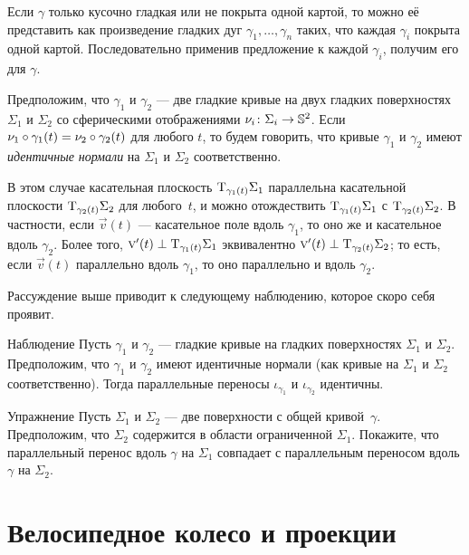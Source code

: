 Если $\gamma$ только кусочно гладкая или не покрыта одной картой, то можно её представить как произведение гладких дуг $\gamma_1,\dots,\gamma_n$ таких, что каждая $\gamma_i$ покрыта одной картой.
Последовательно применив предложение к каждой $\gamma_i$, получим его для $\gamma$.
\qeds


Предположим, что $\gamma_1$ и $\gamma_2$ --- две гладкие кривые на двух гладких поверхностях $\Sigma_1$ и $\Sigma_2$ со сферическими отображениями $\nu_i\colon\Sigma_i\to\mathbb{S}^2$.
Если $\nu_1\circ\gamma_1(t)= \nu_2\circ\gamma_2(t)$ для любого $t$, то будем говорить, что кривые $\gamma_1$ и $\gamma_2$ имеют \emph{идентичные нормали} на $\Sigma_1$ и $\Sigma_2$ соответственно.

В этом случае касательная плоскость $\mathrm{T}_{\gamma_1(t)}\Sigma_1$ параллельна касательной плоскости $\mathrm{T}_{\gamma_2(t)}\Sigma_2$ для любого~$t$, и можно отождествить $\mathrm{T}_{\gamma_1(t)}\Sigma_1$ с $\mathrm{T}_{\gamma_2(t)}\Sigma_2$.
В частности, если $\vec v(t)$ --- касательное поле вдоль $\gamma_1$,
то оно же и касательное вдоль $\gamma_2$.
Более того, $\text{\sc{v}}'(t)\perp \mathrm{T}_{\gamma_1(t)}\Sigma_1$ эквивалентно $\text{\sc{v}}'(t)\perp \mathrm{T}_{\gamma_2(t)}\Sigma_2$; то есть, если $\vec v(t)$ параллельно вдоль $\gamma_1$,
то оно параллельно и вдоль $\gamma_2$.

Рассуждение выше приводит к следующему наблюдению, которое скоро себя проявит.

\begin{thm}{Наблюдение}\label{obs:parallel=}
Пусть $\gamma_1$ и $\gamma_2$ --- гладкие кривые на гладких поверхностях $\Sigma_1$ и $\Sigma_2$.
Предположим, что $\gamma_1$ и $\gamma_2$ имеют идентичные нормали (как кривые на $\Sigma_1$ и $\Sigma_2$ соответственно).
Тогда параллельные переносы $\iota_{\gamma_1}$ и $\iota_{\gamma_2}$ идентичны. 
\end{thm}

\begin{thm}{Упражнение}\label{ex:parallel-transport-support}
Пусть $\Sigma_1$ и $\Sigma_2$ --- две поверхности с общей кривой~$\gamma$.
Предположим, что $\Sigma_2$ содержится в области ограниченной $\Sigma_1$.
Покажите, что параллельный перенос вдоль $\gamma$ на $\Sigma_1$ 
совпадает с параллельным переносом вдоль $\gamma$ на $\Sigma_2$. 
\end{thm}


\section{Велосипедное колесо и проекции}

